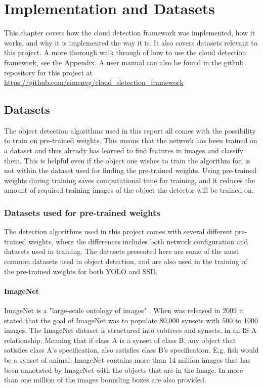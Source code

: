 
\chapter{Implementation and Datasets}

This chapter covers how the cloud detection framework was implemented, how it works, and why it is implemented the way it is. It also covers datasets relevant to this project. A more thorough walk through of how to use the cloud detection framework, see the Appendix. A user manual can also be found in the github repository for this project at \url{https://github.com/simenvg/cloud_detection_framework}

\section{Datasets}
The object detection algorithms used in this report all comes with the possibility to train on pre-trained weights. This means that the network has been trained on a dataset and thus already has learned to find features in images and classify them. This is helpful even if the object one wishes to train the algorithm for, is not within the dataset used for finding the pre-trained weights. Using pre-trained weights during training saves computational time for training, and it reduces the amount of required training images of the object the detector will be trained on.

\vspace{3mm}

\subsection{Datasets used for pre-trained weights}
The detection algorithms used in this project comes with several different pre-trained weights, where the differences includes both network configuration and datasets used in training. The datasets presented here are some of the most common datasets used in object detection, and are also used in the training of the pre-trained weights for both YOLO and SSD.


\subsubsection{ImageNet}
ImageNet is a "large-scale ontology of images" \citep{Deng2009}. When \citep{Deng2009} was released in 2009 it stated that the goal of ImageNet was to populate 80,000 synsets with 500 to 1000 images. The ImageNet dataset is structured into subtrees and synsets, in an IS A relationship. Meaning that if class A is a synset of class B, any object that satisfies class A's specification, also satisfies class B's specification. E.g. fish would be a synset of animal. ImageNet contains more than 14 million images that has been annotated by ImageNet with the objects that are in the image. In more than one million of the images bounding boxes are also provided. 


